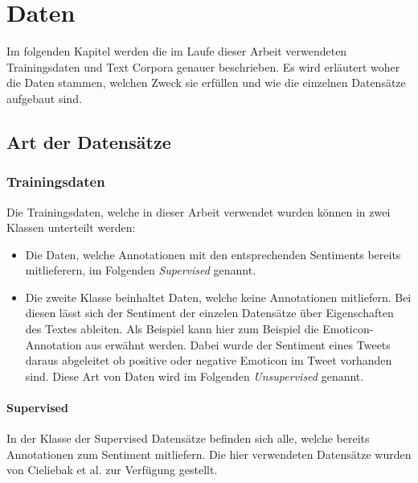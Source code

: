 \chapter{Daten}
Im  folgenden Kapitel werden die im Laufe dieser Arbeit verwendeten Trainingsdaten und Text Corpora genauer beschrieben. Es wird erläutert woher die Daten stammen, welchen Zweck sie erfüllen und wie die einzelnen Datensätze aufgebaut sind.

\section{Art der Datensätze}
\subsection{Trainingsdaten}
Die Trainingsdaten, welche in dieser Arbeit verwendet wurden können in zwei Klassen unterteilt werden:

\begin{itemize}
	\item Die Daten, welche Annotationen mit den entsprechenden Sentiments bereits mitlieferern, im Folgenden \emph{Supervised} genannt.
	\item Die zweite Klasse beinhaltet Daten, welche keine Annotationen mitliefern. Bei diesen lässt sich der Sentiment der einzelen Datensätze über Eigenschaften des Textes ableiten. Als Beispiel kann hier zum Beispiel die Emoticon-Annotation aus \cite{deriu2016sentiment} erwähnt werden. Dabei wurde der Sentiment eines Tweets daraus abgeleitet ob positive oder negative Emoticon im Tweet vorhanden sind. Diese Art von Daten wird im Folgenden \emph{Unsupervised} genannt.
\end{itemize}

\subsubsection{Supervised}
In der Klasse der Supervised Datensätze befinden sich alle, welche bereits Annotationen zum Sentiment mitliefern. Die hier verwendeten Datensätze wurden von Cieliebak et al. \cite{cieliebak2013potential} zur Verfügung gestellt.\\

